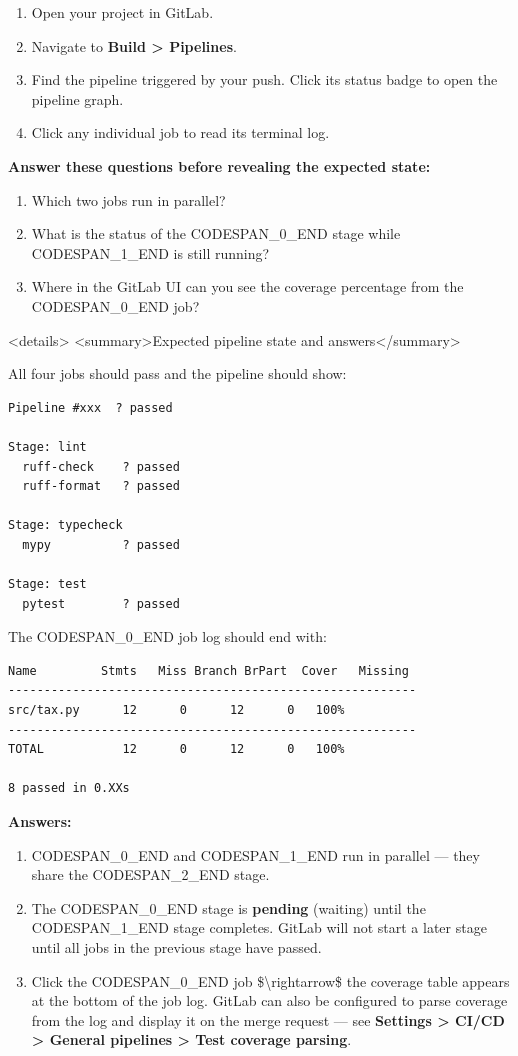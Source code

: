 \documentclass[11pt,a4paper]{book}
\begin{document}
\begin{enumerate}
  \item Open your project in GitLab.
  \item Navigate to \textbf{Build > Pipelines}.
  \item Find the pipeline triggered by your push. Click its status badge to open the pipeline graph.
  \item Click any individual job to read its terminal log.
\end{enumerate}

\textbf{Answer these questions before revealing the expected state:}

\begin{enumerate}
  \item Which two jobs run in parallel?
  \item What is the status of the CODESPAN\_0\_END stage while CODESPAN\_1\_END is still running?
  \item Where in the GitLab UI can you see the coverage percentage from the CODESPAN\_0\_END job?
\end{enumerate}

<details>
<summary>Expected pipeline state and answers</summary>

All four jobs should pass and the pipeline should show:

\begin{lstlisting}
Pipeline #xxx  ? passed

Stage: lint
  ruff-check    ? passed
  ruff-format   ? passed

Stage: typecheck
  mypy          ? passed

Stage: test
  pytest        ? passed
\end{lstlisting}

The CODESPAN\_0\_END job log should end with:

\begin{lstlisting}
Name         Stmts   Miss Branch BrPart  Cover   Missing
---------------------------------------------------------
src/tax.py      12      0      12      0   100%
---------------------------------------------------------
TOTAL           12      0      12      0   100%

8 passed in 0.XXs
\end{lstlisting}

\textbf{Answers:}

\begin{enumerate}
  \item CODESPAN\_0\_END and CODESPAN\_1\_END run in parallel --- they share the CODESPAN\_2\_END stage.
  \item The CODESPAN\_0\_END stage is \textbf{pending} (waiting) until the CODESPAN\_1\_END stage completes. GitLab will not start a later stage until all jobs in the previous stage have passed.
  \item Click the CODESPAN\_0\_END job \$\textbackslash{}rightarrow\$ the coverage table appears at the bottom of the job log. GitLab can also be configured to parse coverage from the log and display it on the merge request --- see \textbf{Settings > CI/CD > General pipelines > Test coverage parsing}.
\end{enumerate}
\end{document}
